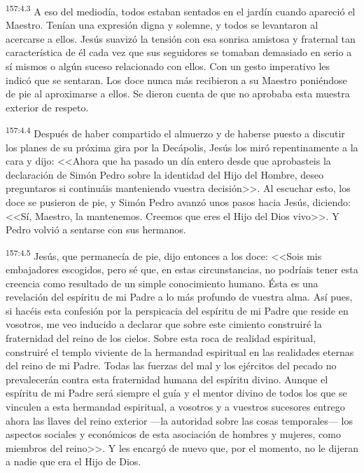 \par 
\textsuperscript{157:4.3} A eso del mediodía, todos estaban sentados en el jardín cuando apareció el Maestro. Tenían una expresión digna y solemne, y todos se levantaron al acercarse a ellos. Jesús suavizó la tensión con esa sonrisa amistosa y fraternal tan característica de él cada vez que sus seguidores se tomaban demasiado en serio a sí mismos o algún suceso relacionado con ellos. Con un gesto imperativo les indicó que se sentaran. Los doce nunca más recibieron a su Maestro poniéndose de pie al aproximarse a ellos. Se dieron cuenta de que no aprobaba esta muestra exterior de respeto.

\par 
\textsuperscript{157:4.4} Después de haber compartido el almuerzo y de haberse puesto a discutir los planes de su próxima gira por la Decápolis, Jesús los miró repentinamente a la cara y dijo: <<Ahora que ha pasado un día entero desde que aprobasteis la declaración de Simón Pedro sobre la identidad del Hijo del Hombre, deseo preguntaros si continuáis manteniendo vuestra decisión>>. Al escuchar esto, los doce se pusieron de pie, y Simón Pedro avanzó unos pasos hacia Jesús, diciendo: <<Sí, Maestro, la mantenemos. Creemos que eres el Hijo del Dios vivo>>. Y Pedro volvió a sentarse con sus hermanos.

\par 
\textsuperscript{157:4.5} Jesús, que permanecía de pie, dijo entonces a los doce: <<Sois mis embajadores escogidos, pero sé que, en estas circunstancias, no podríais tener esta creencia como resultado de un simple conocimiento humano. Ésta es una revelación del espíritu de mi Padre a lo más profundo de vuestra alma. Así pues, si hacéis esta confesión por la perspicacia del espíritu de mi Padre que reside en vosotros, me veo inducido a declarar que sobre este cimiento construiré la fraternidad del reino de los cielos. Sobre esta roca de realidad espiritual, construiré el templo viviente de la hermandad espiritual en las realidades eternas del reino de mi Padre. Todas las fuerzas del mal y los ejércitos del pecado no prevalecerán contra esta fraternidad humana del espíritu divino. Aunque el espíritu de mi Padre será siempre el guía y el mentor divino de todos los que se vinculen a esta hermandad espiritual, a vosotros y a vuestros sucesores entrego ahora las llaves del reino exterior ---la autoridad sobre las cosas temporales--- los aspectos sociales y económicos de esta asociación de hombres y mujeres, como miembros del reino>>. Y les encargó de nuevo que, por el momento, no le dijeran a nadie que era el Hijo de Dios.

